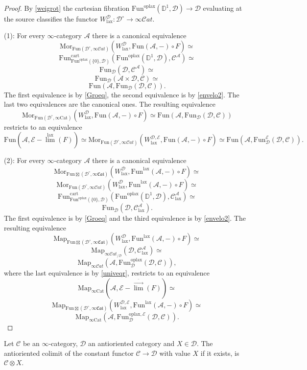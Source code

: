 \documentclass[10pt,oneside]{article}
\numberwithin{equation}{section} %
\numberwithin{figure}{section} %
\theoremstyle{plain}
\theoremstyle{definition}
\newcommand{\bD}{{\mathbb D}}
\newcommand{\mA}{{\mathcal A}}
\newcommand{\mC}{{\mathcal C}}
\newcommand{\mD}{{\mathcal D}}
\newcommand{\mE}{{\mathcal E}}
\newcommand{\W}{W}
\newcommand{\ot}{\otimes}
\newcommand{\Cat}{\mathrm{Cat}}
\newcommand{\Fun}{\mathrm{Fun}}
\newcommand{\cart}{{\mathrm{cart}}}
\newcommand{\lax}{{\mathrm{lax}}}
\newcommand{\oplax}{{\mathrm{oplax}}}
\newcommand{\Map}{{\mathrm{Map}}}
\newcommand{\Mor}{{\mathrm{Mor}}}
\newcommand{\scat}{\mathcal{C}\mathit{at}}
\begin{document}
\begin{proof}
By \cref{weigrot} the cartesian fibration 
$\Fun^\oplax(\bD^1,\mD)\to \mD$ evaluating at the source
classifies the functor $ \W^{\mD}_\lax: \mD^\circ \to \infty\scat$.

(1): For every $\infty$-category $\mA$ there is a canonical equivalence $$\Mor_{\Fun(\mD^\circ,\infty\scat)}(\W^{\mD}_\lax, \Fun(\mA,-) \circ F) \simeq$$$$ \Fun^\cart_{\Fun^\oplax(\{0\},\mD)}(\Fun^\oplax(\bD^1,\mD), \mC^\mA) \simeq $$$$ \Fun_\mD(\mD,\mC^\mA) \simeq $$$$\Fun_\mD(\mA \times \mD,\mC) \simeq $$$$\Fun(\mA, \Fun_\mD(\mD,\mC)).$$
The first equivalence is by \cref{Groeq},
the second equivalence is by \cref{envelo2}.
The last two equivalences are the canonical ones.
The resulting equivalence $$\Mor_{\Fun(\mD^\circ,\infty\Cat)}(\W^{\mD}_\lax, \Fun(\mA,-) \circ F) \simeq \Fun(\mA, \Fun_\mD(\mD,\mC)) $$
restricts to an equivalence $$\Fun(\mA, \mE-\overset{\lax}{\lim}(F)) \simeq \Mor_{\Fun(\mD^\circ,\infty\scat)}(\W^{\mD,\mE}_\lax, \Fun(\mA,-) \circ F) \simeq \Fun(\mA, \Fun^\mE_\mD(\mD,\mC)).$$

(2): For every $\infty$-category $\mA$ there is a canonical equivalence $$ \Mor_{{\Fun\boxtimes}(\mD^\circ,\infty\mathfrak{Cat})}(\W^{\mD}_\lax, \Fun^\lax(\mA,-) \circ F) \simeq $$$$ \Mor_{{\Fun}(\mD^\circ,\infty\scat)}(\W^{\mD}_\lax, \Fun^\lax(\mA,-) \circ F)\simeq $$
$$ \Fun^\cart_{\Fun^\oplax(\{0\},\mD)}(\Fun^\oplax(\bD^1,\mD), \mC_\lax^\mA) \simeq $$$$ \Fun_\mD(\mD,\mC^\mA_\lax).$$
The first equivalence is by \cref{Groeq} and the third equivalence is by \cref{envelo2}.
The resulting equivalence
$$ \Map_{{\Fun\boxtimes}(\mD^\circ,\infty\mathfrak{Cat})}(\W^{\mD}_\lax, \Fun^\lax(\mA,-) \circ F) \simeq $$$$ \Map_{\infty\scat_{/\mD}}(\mD,\mC^\mA_\lax) \simeq $$$$ \Map_{\infty\scat}(\mA, \Fun^\oplax_\mD(\mD,\mC)), $$
where the last equivalence is by \cref{univeqr}, 
restricts to an equivalence $$\Map_{\infty\Cat}(\mA, \mE-\overset{\bar{\to}}{\lim}(F)) \simeq $$$$ \Map_{{\Fun\boxtimes}(\mD^\circ,\infty\mathfrak{Cat})}(\W^{\mD,\mE}_\lax, \Fun^\lax(\mA,-) \circ F) \simeq $$$$ \Map_{\infty\Cat}(\mA, \Fun^{\oplax,\mE}_\mD(\mD,\mC)).$$
\end{proof}

\begin{theorem}\label{Graytenso}

Let $\mC$ be an $\infty$-category, $\mD$ an antioriented category  and $X \in \mD. $
The antioriented colimit of the constant functor $\mC \to \mD$
with value $X$ if it exists, is $\mC \ot X $.
    
\end{theorem}
\end{document}
